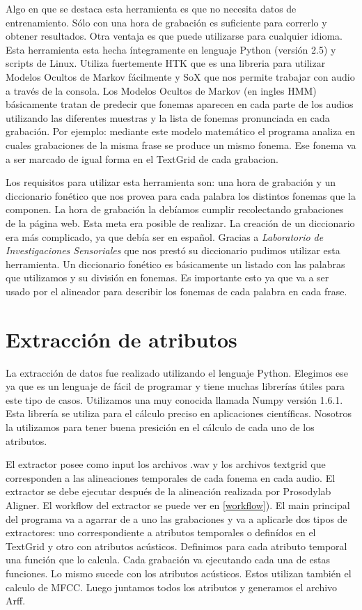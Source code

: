Algo en que se destaca esta herramienta es que no necesita datos de entrenamiento. Sólo con una hora de grabación es suficiente para correrlo y obtener resultados. Otra ventaja es que puede utilizarse para cualquier idioma. Esta herramienta esta hecha íntegramente en lenguaje Python (versión 2.5) y scripts de Linux. Utiliza fuertemente HTK que es una libreria para utilizar Modelos Ocultos de Markov fácilmente y SoX que nos permite trabajar con audio a través de la consola. Los Modelos Ocultos de Markov \cite{rabiner} (en ingles HMM) básicamente tratan de predecir que fonemas aparecen en cada parte de los audios utilizando las diferentes muestras y la lista de fonemas pronunciada en cada grabación. Por ejemplo: mediante este modelo matemático el programa analiza en cuales grabaciones de la misma frase se produce un mismo fonema. Ese fonema va a ser marcado de igual forma en el TextGrid de cada grabacion.

Los requisitos para utilizar esta herramienta son: una hora de grabación y un diccionario fonético que nos provea para cada palabra los distintos fonemas que la componen. La hora de grabación la debíamos cumplir recolectando grabaciones de la página web. Esta meta era posible de realizar. La creación de un diccionario era más complicado, ya que debía ser en español. Gracias a \textit{Laboratorio de Investigaciones Sensoriales} que nos prestó su diccionario pudimos utilizar esta herramienta. Un diccionario fonético es básicamente un listado con las palabras que utilizamos y su división en fonemas. Es importante esto ya que va a ser usado por el alineador para describir los fonemas de cada palabra en cada frase.

\section{Extracción de atributos}

La extracción de datos fue realizado utilizando el lenguaje Python. Elegimos ese ya que es un lenguaje de fácil de programar y tiene muchas librerías útiles para este tipo de casos. Utilizamos una muy conocida llamada Numpy versión 1.6.1. Esta librería se utiliza para el cálculo preciso en aplicaciones científicas. Nosotros la utilizamos para tener buena presición en el cálculo de cada uno de los atributos.

El extractor posee como input los archivos .wav y los archivos textgrid que corresponden a las alineaciones temporales de cada fonema en cada audio. El extractor se debe ejecutar después de la alineación realizada por Prosodylab Aligner. El workflow del extractor se puede ver en \ref{workflow}). El main principal del programa va a agarrar de a uno las grabaciones y va a aplicarle dos tipos de extractores: uno correspondiente a atributos temporales o definídos en el TextGrid y otro con atributos acústicos. Definimos para cada atributo temporal una función que lo calcula. Cada grabación va ejecutando cada una de estas funciones. Lo mismo sucede con los atributos acústicos. Estos utilizan también el calculo de MFCC. Luego juntamos todos los atributos y generamos el archivo Arff.

